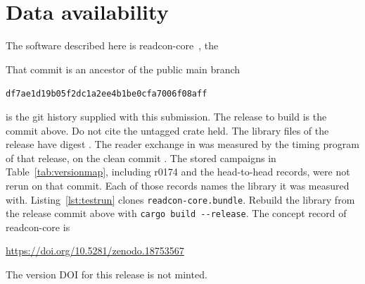 \documentclass[preprint,12pt]{elsarticle}
\newcommand{\DOIPENDING}{The version DOI for this release is not minted.}
\begin{document}
\FloatBarrier \section*{Data availability}\label{sec:data} The software
described here is readcon-core~\readconversion{}, the
\readconcommitrole{} \begin{center} \texttt{\readconcommit} \end{center}
That commit is an ancestor of the public main branch \begin{center}
\texttt{df7ae1d19b05f2dc1a2ee4b1be0cfa7006f08aff} \end{center}
 is the git history supplied with this
submission.
The release to build is the commit above.
Do not cite the untagged crate %
held.
The library files of the release have digest \texttt{\readcondigest}.
\readcontagstate{} The reader exchange in
 was measured by the
timing program of that release, on the clean commit
\texttt{\rcHostCommit}.
The stored campaigns in Table~\ref*{tab:versionmap}, including r0174 and
the head-to-head records, were not rerun on that commit.
Each of those records names the library it was measured with.
Listing~\ref{lst:testrun} clones \texttt{readcon-core.bundle}.
Rebuild the library from the release commit above with \texttt{cargo
build -{}-release}.
The concept record of readcon-core
\cite{goswamiReadconcoreConConvel2026} is \begin{center}
\url{https://doi.org/10.5281/zenodo.18753567} \end{center} \DOIPENDING
\end{document}
